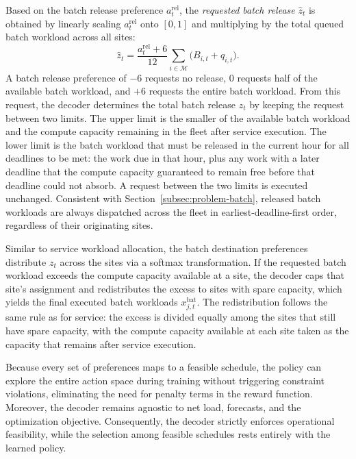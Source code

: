 \documentclass{UNCC-thesis}
\begin{document}
Based on the batch release preference \(a^{\mathrm{rel}}_t\), the \emph{requested batch
release} \(\hat z_t\) is obtained by linearly scaling \(a^{\mathrm{rel}}_t\) onto \([0,1]\)
and multiplying by the total queued batch workload across all sites:
\begin{equation}
  \hat z_t
  =
  \frac{a^{\mathrm{rel}}_t+6}{12}
  \sum_{i\in\mathcal M}\bigl(B_{i,t}+q_{i,t}\bigr).
  \label{eq:release-request}
\end{equation}
A batch release preference of \(-6\) requests no release, 0 requests half of the available
batch workload, and \(+6\) requests the entire batch workload. From this request, the decoder
determines the total batch release \(z_t\) by keeping the request between two limits. The upper
limit is the smaller of the available batch workload and the compute capacity remaining in the
fleet after service execution. The lower limit is the batch workload that must be released in
the current hour for all deadlines to be met: the work due in that hour, plus any work with a
later deadline that the compute capacity guaranteed to remain free before that deadline could
not absorb. A request between the two limits is executed unchanged.
Consistent with Section~\ref{subsec:problem-batch}, released batch workloads
are always dispatched across the fleet in earliest-deadline-first order, regardless of their
originating sites.

Similar to service workload allocation, the batch destination preferences distribute
\(z_t\) across the sites via a softmax transformation. If the requested batch workload exceeds
the compute capacity available at a site, the decoder caps that site's assignment and
redistributes the excess to sites with spare capacity, which yields the final executed batch
workloads \(x^{\mathrm{bat}}_{j,t}\). The redistribution follows the same rule as for service:
the excess is divided equally among the sites that still have spare capacity, with the compute
capacity available at each site taken as the capacity that remains after service execution.

Because every set of preferences maps to a feasible schedule, the policy can explore the
entire action space during training without triggering constraint violations, eliminating
the need for penalty terms in the reward function. Moreover, the decoder remains agnostic to
net load, forecasts, and the optimization objective. Consequently, the decoder strictly
enforces operational feasibility, while the selection among feasible schedules rests entirely
with the learned policy.
\end{document}
